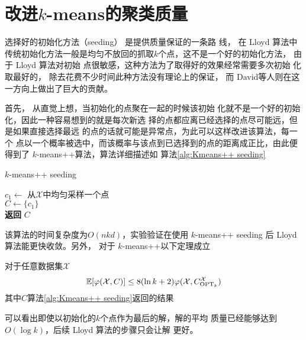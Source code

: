 \section{改进\texorpdfstring{$k$}{k}-means的聚类质量}

选择好的初始化方法（seeding） 是提供质量保证的一条路
线， 在 Lloyd 算法中传统初始化方法一般是均匀不放回的抓取$k$个点，这不是一个好的初始化方法， 由于 Lloyd 算法对初始
点很敏感，这种方法为了取得好的效果经常需要多次初始
化取最好的， 除去花费不少时间此种方法没有理论上的保证，
而 David等人则在这一方向上做出了巨大的贡献。

首先， 从直觉上想，当初始化的点聚在一起的时候该初始
化就不是一个好的初始化，因此一种容易想到的就是每次新选
择的点都应离已经选择的点尽可能远，但是如果直接选择最远
的点的话就可能是异常点，为此可以这样改进该算法，每一个
点以一个概率被选中，而该概率与该点到已选择到的点的距离成正比，由此便得到了 $k$-means++算法，算法详细描述如
算法\ref{alg:Kmeans++ seeding}

\begin{algorithm}
    \caption{$k$-means++ seeding}\label{alg:Kmeans++ seeding}
    $c_1 \gets $ 从$\mathcal{X}$中均匀采样一个点 \\
    $C \gets \{c_1\}$ \\
    \textbf{返回} $C$
\end{algorithm}
该算法的时间复杂度为$O(nkd)$，实验验证在使用 $k$-means++ seeding 后 Lloyd 算法能更快收敛。另外， 对于 $k$-means++以下定理成立
\begin{theorem}
    对于任意数据集$\mathcal{X}$
    \begin{equation}
    \mathbb{E}[\varphi(\mathcal{X},C)] \leq 8(\ln k + 2) \varphi(\mathcal{X},C_{\text{OPT}_k}^{\mathcal{X}})
    \end{equation}
    其中$C$算法\ref{alg:Kmeans++ seeding}返回的结果
\end{theorem}
可以看出即使以初始化的$k$个点作为最后的解，解的平均
质量已经能够达到$O(\log k)$，后续 Lloyd 算法的步骤只会让解
更好。

